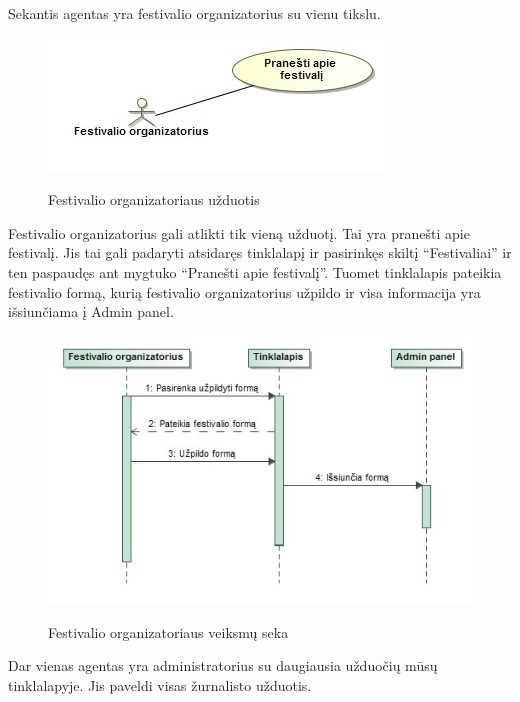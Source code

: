 ﻿\documentclass{VUMIFPSkursinis}
\begin{document}
Sekantis agentas yra festivalio organizatorius su vienu tikslu.

\begin{figure}[H]
    \centering
    \includegraphics[scale=0.45]{img/Pav/FestivalioOrg}
    \label{img:uml7}
	\caption{Festivalio organizatoriaus užduotis}
\end{figure}	
	
Festivalio organizatorius gali atlikti tik vieną užduotį. Tai yra pranešti apie festivalį. Jis tai gali padaryti atsidaręs tinklalapį ir pasirinkęs skiltį “Festivaliai” ir ten paspaudęs ant mygtuko “Pranešti apie festivalį”. Tuomet tinklalapis pateikia festivalio formą, kurią festivalio organizatorius užpildo ir visa informacija yra išsiunčiama į Admin panel.

\begin{figure}[H]
    \centering
    \includegraphics[scale=0.45]{img/Pav/FestivalOrgPranesti}
    \label{img:uml8}
	\caption{Festivalio organizatoriaus veiksmų seka}
\end{figure}	

Dar vienas agentas yra administratorius su daugiausia užduočių mūsų tinklalapyje. Jis paveldi visas žurnalisto užduotis.
\end{document}
